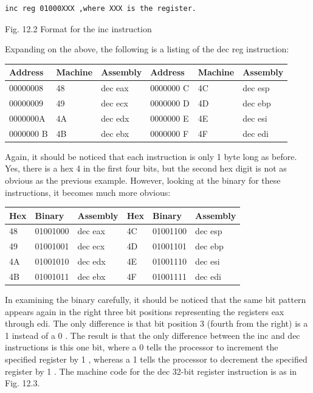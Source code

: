 \documentclass[10pt]{book}
\begin{document}
\begin{verbatim}
inc reg 01000XXX ,where XXX is the register.
\end{verbatim}

Fig. 12.2 Format for the inc instruction

Expanding on the above, the following is a listing of the dec reg instruction:

\begin{center}
\begin{tabular}{|l|l|l|l|l|l|}
\hline
Address & Machine & Assembly & Address & Machine & Assembly \\
\hline
00000008 & 48 & dec eax & 0000000 C & 4C & dec esp \\
\hline
00000009 & 49 & dec ecx & 0000000 D & 4D & dec ebp \\
\hline
0000000A & 4A & dec edx & 0000000 E & 4E & dec esi \\
\hline
0000000 B & 4B & dec ebx & 0000000 F & 4F & dec edi \\
\hline
\end{tabular}
\end{center}

Again, it should be noticed that each instruction is only 1 byte long as before. Yes, there is a hex 4 in the first four bits, but the second hex digit is not as obvious as the previous example. However, looking at the binary for these instructions, it becomes much more obvious:

\begin{center}
\begin{tabular}{|l|l|l|l|l|l|}
\hline
Hex & Binary & Assembly & Hex & Binary & Assembly \\
\hline
48 & 01001000 & dec eax & 4C & 01001100 & dec esp \\
\hline
49 & 01001001 & dec ecx & 4D & 01001101 & dec ebp \\
\hline
4A & 01001010 & dec edx & 4E & 01001110 & dec esi \\
\hline
4B & 01001011 & dec ebx & 4F & 01001111 & dec edi \\
\hline
\end{tabular}
\end{center}

In examining the binary carefully, it should be noticed that the same bit pattern appears again in the right three bit positions representing the registers eax through edi. The only difference is that bit position 3 (fourth from the right) is a 1 instead of a 0 . The result is that the only difference between the inc and dec instructions is this one bit, where a 0 tells the processor to increment the specified register by 1 , whereas a 1 tells the processor to decrement the specified register by 1 . The machine code for the dec 32-bit register instruction is as in Fig. 12.3.
\end{document}
